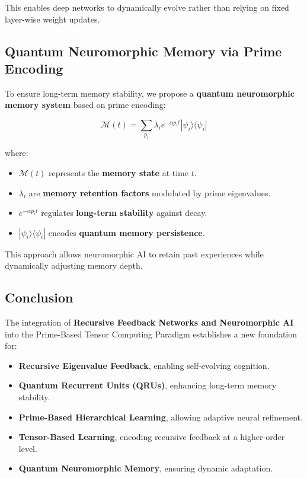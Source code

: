 \documentclass{article}
\theoremstyle{plain}
\theoremstyle{plain}
\theoremstyle{definition}
\theoremstyle{remark}
\begin{document}
This enables deep networks to dynamically evolve rather than relying on fixed layer-wise weight updates.

\subsection{Quantum Neuromorphic Memory via Prime Encoding}

To ensure long-term memory stability, we propose a \textbf{quantum neuromorphic memory system} based on prime encoding:

\begin{equation}
\mathcal{M}(t) = \sum_{p_i} \lambda_i e^{- \alpha p_i t} |\psi_i\rangle \langle \psi_i |
\end{equation}

where:
\begin{itemize}
    \item $\mathcal{M}(t)$ represents the \textbf{memory state} at time $t$.
    \item $\lambda_i$ are \textbf{memory retention factors} modulated by prime eigenvalues.
    \item $e^{- \alpha p_i t}$ regulates \textbf{long-term stability} against decay.
    \item $|\psi_i\rangle \langle \psi_i |$ encodes \textbf{quantum memory persistence}.
\end{itemize}

This approach allows neuromorphic AI to retain past experiences while dynamically adjusting memory depth.

\subsection{Conclusion}

The integration of \textbf{Recursive Feedback Networks and Neuromorphic AI} into the Prime-Based Tensor Computing Paradigm establishes a new foundation for:
\begin{itemize}
    \item \textbf{Recursive Eigenvalue Feedback}, enabling self-evolving cognition.
    \item \textbf{Quantum Recurrent Units (QRUs)}, enhancing long-term memory stability.
    \item \textbf{Prime-Based Hierarchical Learning}, allowing adaptive neural refinement.
    \item \textbf{Tensor-Based Learning}, encoding recursive feedback at a higher-order level.
    \item \textbf{Quantum Neuromorphic Memory}, ensuring dynamic adaptation.
\end{itemize}
\end{document}
